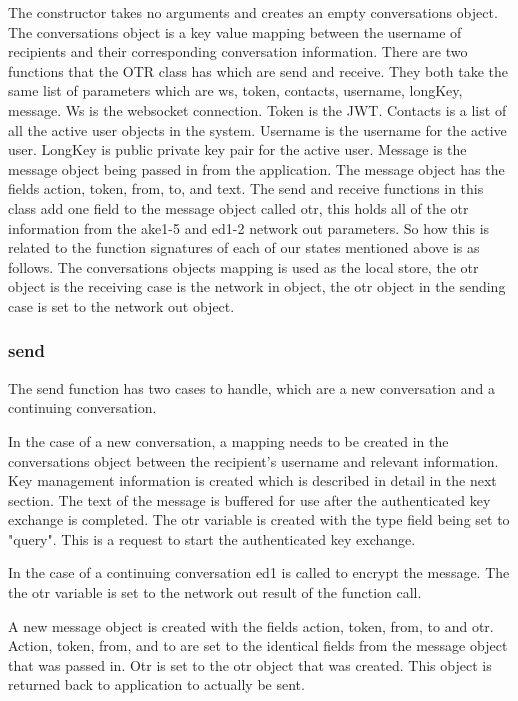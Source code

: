 The constructor takes no arguments and creates an empty conversations object. The conversations object is a key value mapping between the username of recipients and their corresponding conversation information. There are two functions that the OTR class has which are send and receive. They both take the same list of parameters which are ws, token, contacts, username, longKey, message. Ws is the websocket connection. Token is the JWT. Contacts is a list of all the active user objects in the system. Username is the username for the active user. LongKey is public private key pair for the active user. Message is the message object being passed in from the application. The message object has the fields action, token, from, to, and text. The send and receive functions in this class add one field to the message object called otr, this holds all of the otr information from the ake1-5 and ed1-2 network out parameters. So how this is related to the function signatures of each of our states mentioned above is as follows. The conversations objects mapping is used as the local store, the otr object is the receiving case is the network in object, the otr object in the sending case is set to the network out object.  


\subsubsection{send}


The send function has two cases to handle, which are a new conversation and a continuing conversation.


In the case of a new conversation, a mapping needs to be created in the conversations object between the recipient's username and relevant information. Key management information is created which is described in detail in the next section. The text of the message is buffered for use after the authenticated key exchange is completed. The otr variable is created with the type field being set to "query". This is a request to start the authenticated key exchange.


In the case of a continuing conversation ed1 is called to encrypt the message. The the otr variable is set to the network out result of the function call. 


A new message object is created with the fields action, token, from, to and otr. Action, token, from, and to are set to the identical fields from the message object that was passed in. Otr is set to the otr object that was created. This object is returned back to application to actually be sent.


